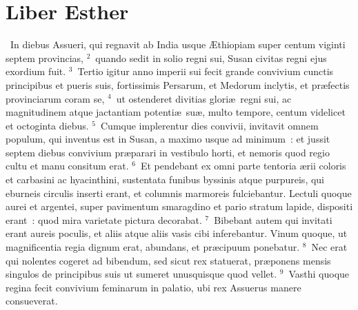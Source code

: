 {\centering \section*{Liber Esther}}\thispagestyle{empty}

~\lettrine[lines=10,image=true,loversize=0.05,lraise=-0.03]{I}{}n diebus Assueri, qui regnavit ab India usque \AE thiopiam super centum viginti septem provincias,
${}^{2}$~quando sedit in solio regni sui, Susan civitas regni ejus exordium fuit.
${}^{3}$~Tertio igitur anno imperii sui fecit grande convivium cunctis principibus et pueris suis, fortissimis Persarum, et Medorum inclytis, et pr\ae fectis provinciarum coram se,
${}^{4}$~ut ostenderet divitias glori\ae\ regni sui, ac magnitudinem atque jactantiam potenti\ae\ su\ae , multo tempore, centum videlicet et octoginta diebus.
${}^{5}$~Cumque implerentur dies convivii, invitavit omnem populum, qui inventus est in Susan, a maximo usque ad minimum~: et jussit septem diebus convivium pr\ae parari in vestibulo horti, et nemoris quod regio cultu et manu consitum erat.
${}^{6}$~Et pendebant ex omni parte tentoria \ae rii coloris et carbasini ac hyacinthini, sustentata funibus byssinis atque purpureis, qui eburneis circulis inserti erant, et columnis marmoreis fulciebantur. Lectuli quoque aurei et argentei, super pavimentum smaragdino et pario stratum lapide, dispositi erant~: quod mira varietate pictura decorabat.
${}^{7}$~Bibebant autem qui invitati erant aureis poculis, et aliis atque aliis vasis cibi inferebantur. Vinum quoque, ut magnificentia regia dignum erat, abundans, et pr\ae cipuum ponebatur.
${}^{8}$~Nec erat qui nolentes cogeret ad bibendum, sed sicut rex statuerat, pr\ae ponens mensis singulos de principibus suis ut sumeret unusquisque quod vellet.
${}^{9}$~Vasthi quoque regina fecit convivium feminarum in palatio, ubi rex Assuerus manere consueverat.


